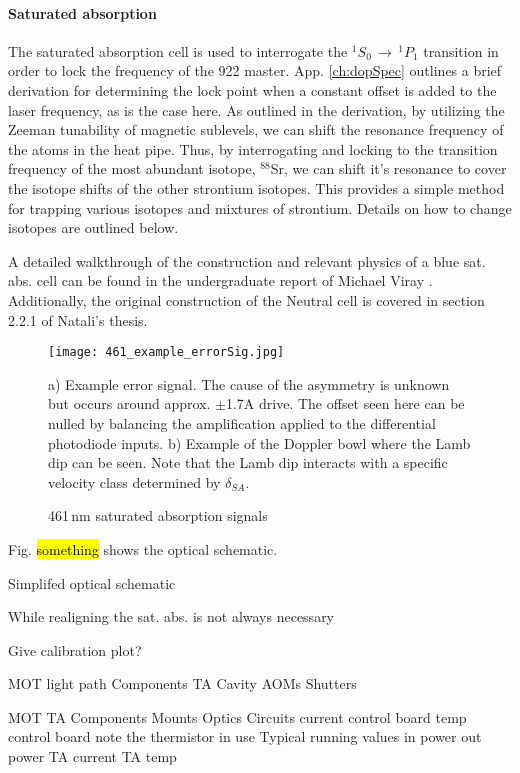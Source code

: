\paragraph{Saturated absorption}
The saturated absorption cell is used to interrogate the $^1S_0\,\rightarrow\,^1P_1$ transition in order to lock the frequency of the 922 master.
App. \ref{ch:dopSpec} outlines a brief derivation for determining the lock point when a constant offset is added to the laser frequency, as is the case here.
As outlined in the derivation, by utilizing the Zeeman tunability of magnetic sublevels, we can shift the resonance frequency of the atoms in the heat pipe.
Thus, by interrogating and locking to the transition frequency of the most abundant isotope, $^{88}$Sr, we can shift it's resonance to cover the isotope shifts of the other strontium isotopes.
This provides a simple method for trapping various isotopes and mixtures of strontium.
Details on how to change isotopes are outlined below.

A detailed walkthrough of the construction and relevant physics of a blue sat. abs. cell can be found in the undergraduate report of Michael Viray \cite{MichaelViray2014}.
Additionally, the original construction of the Neutral cell is covered in section 2.2.1 of Natali's thesis.

	\begin{figure}
		\centerline{
		\texttt{[image: 461\_example\_errorSig.jpg]}}
		\caption{461\,nm saturated absorption signals}{a) Example error signal. The cause of the asymmetry is unknown but occurs around approx. $\pm$1.7A drive. The offset seen here can be nulled by balancing the amplification applied to the differential photodiode inputs. b) Example of the Doppler bowl where the Lamb dip can be seen. Note that the Lamb dip interacts with a specific velocity class determined by $\delta_{SA}$.}
		\label{fig:461zeemanBeam}
	\end{figure}

Fig. \hl{something} shows the optical schematic.



Simplifed optical schematic

While realigning the sat. abs. is not always necessary

Give calibration plot?

MOT light path
	Components
		TA
		Cavity
		AOMs
		Shutters
	
	MOT TA
		Components
			Mounts
			Optics
			Circuits
				current control board
				temp control board
					note the thermistor in use
		Typical running values
			in power
			out power
			TA current
			TA temp
		
